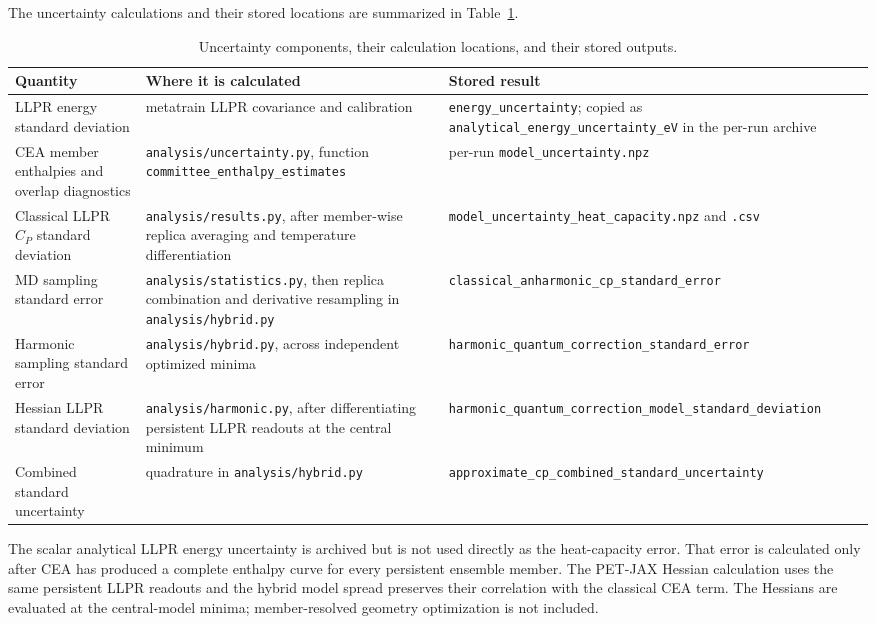 \documentclass[10pt,a4paper,twocolumn]{article}
\begin{document}
The uncertainty calculations and their stored locations are summarized in
Table~\ref{tab:uncertainty-outputs}.

\begin{table}[t]
\centering
\small
\caption{Uncertainty components, their calculation locations, and their
stored outputs.}
\label{tab:uncertainty-outputs}
\begin{tabular}{@{}p{3.3cm}p{5.0cm}p{5.4cm}@{}}
\toprule
Quantity & Where it is calculated & Stored result \\
\midrule
LLPR energy standard deviation & metatrain LLPR covariance and calibration &
\texttt{energy\_uncertainty}; copied as
\texttt{analytical\_energy\_uncertainty\_eV} in the per-run archive \\
CEA member enthalpies and overlap diagnostics &
\texttt{analysis/uncertainty.py}, function
\texttt{committee\_enthalpy\_estimates} & per-run
\texttt{model\_uncertainty.npz} \\
Classical LLPR $C_P$ standard deviation &
\texttt{analysis/results.py}, after member-wise replica averaging and
temperature differentiation &
\texttt{model\_uncertainty\_heat\_capacity.npz} and \texttt{.csv} \\
MD sampling standard error &
\texttt{analysis/statistics.py}, then replica combination and derivative
resampling in \texttt{analysis/hybrid.py} &
\texttt{classical\_anharmonic\_cp\_standard\_error} \\
Harmonic sampling standard error &
\texttt{analysis/hybrid.py}, across independent optimized minima &
\texttt{harmonic\_quantum\_correction\_standard\_error} \\
Hessian LLPR standard deviation &
\texttt{analysis/harmonic.py}, after differentiating persistent LLPR readouts
at the central minimum &
\texttt{harmonic\_quantum\_correction\_model\_standard\_deviation} \\
Combined standard uncertainty & quadrature in
\texttt{analysis/hybrid.py} &
\texttt{approximate\_cp\_combined\_standard\_uncertainty} \\
\bottomrule
\end{tabular}
\end{table}

The scalar analytical LLPR energy uncertainty is archived but is not used
directly as the heat-capacity error. That error is calculated only after CEA
has produced a complete enthalpy curve for every persistent ensemble member.
The PET-JAX Hessian calculation uses the same persistent LLPR readouts and the
hybrid model spread preserves their correlation with the classical CEA term.
The Hessians are evaluated at the central-model minima; member-resolved
geometry optimization is not included.
\end{document}
